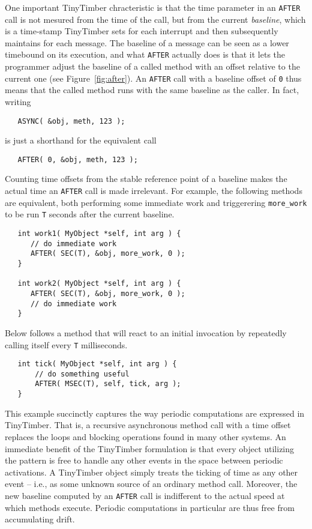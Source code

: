 \documentclass[12pt]{article}
\begin{document}
One important TinyTimber chracteristic is that the time parameter in an {\tt AFTER} call is not mesured from the time of the call, but from the current {\em baseline}, which is a time-stamp TinyTimber sets for each interrupt and then subsequently maintains for each message.  The baseline of a message can be seen as a lower timebound on its execution, and what {\tt AFTER} actually does is that it lets the programmer adjust the baseline of a called method with an offset relative to the current one (see Figure~\ref{fig:after}). An {\tt AFTER} call with a baseline offset of {\tt 0} thus means that the called method runs with the same baseline as the caller. In fact, writing
\begin{verbatim}
   ASYNC( &obj, meth, 123 );
\end{verbatim}
is just a shorthand for the equivalent call
\begin{verbatim}
   AFTER( 0, &obj, meth, 123 );
\end{verbatim}

Counting time offsets from the stable reference point of a baseline makes the actual time an {\tt AFTER} call is made irrelevant.  For example, the following methods are equivalent, both performing some immediate work and triggerering \verb!more_work! to be run {\tt T} seconds after the current baseline.
\begin{verbatim}
   int work1( MyObject *self, int arg ) {
      // do immediate work
      AFTER( SEC(T), &obj, more_work, 0 );
   }
   
   int work2( MyObject *self, int arg ) {
      AFTER( SEC(T), &obj, more_work, 0 );
      // do immediate work
   }
\end{verbatim}

Below follows a method that will react to an initial invocation by repeatedly calling itself every {\tt T} milliseconds.
\begin{verbatim}
   int tick( MyObject *self, int arg ) {
       // do something useful
       AFTER( MSEC(T), self, tick, arg );
   }
\end{verbatim}
This example succinctly captures the way periodic computations are expressed in TinyTimber.  That is, a recursive asynchronous method call with a time offset replaces the loops and blocking operations found in many other systems.  An immediate benefit of the TinyTimber formulation is that every object utilizing the pattern is free to handle any other events in the space between periodic activations.  A TinyTimber object simply treats the ticking of time as any other event -- i.e., as some unknown source of an ordinary method call.  Moreover, the new baseline computed by an {\tt AFTER} call is indifferent to the actual speed at which methods execute.  Periodic computations in particular are thus free from accumulating drift.
\end{document}
